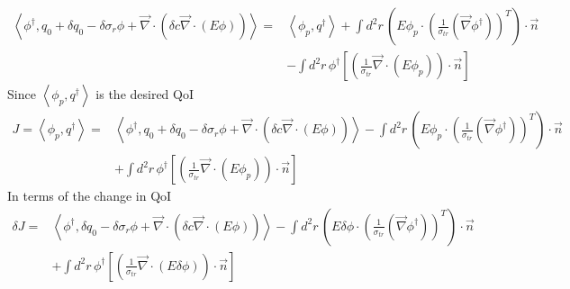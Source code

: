\documentclass{article}
\newcommand{\bra}{\left\langle}
\newcommand{\ket}{\right\rangle}
\newcommand{\vdiv}{\vec{\nabla} \cdot}
\newcommand{\vgrad}{\vec{\nabla}}
\begin{document}
\begin{align*}
\bra \phi^\dag , q_0 + \delta q_0 - \delta \sigma_r \phi + \vdiv \left( \delta c \vdiv \left( E \phi \right) \right) \ket =& \bra \phi_p, q^\dag \ket + \int d^2 r \, \left( E \phi_p \cdot \left( \frac{1}{ \sigma_{tr}} \left(  \vgrad \phi^\dag \right) \right)^T \right) \cdot \vec{n} \\
&- \int d^2 r \, \phi^\dag \left[ \left( \frac{1}{\sigma_{tr}} \vdiv \left( E \phi_p \right) \right) \cdot \vec{n} \right]
\end{align*}
Since $\bra \phi_p, q^\dag \ket $ is the desired QoI
\begin{align*}
J = \bra \phi_p, q^\dag \ket =& \bra \phi^\dag , q_0 + \delta q_0 - \delta \sigma_r \phi + \vdiv \left( \delta c \vdiv \left( E \phi \right) \right)  \ket - \int d^2 r \, \left( E \phi_p \cdot \left( \frac{1}{ \sigma_{tr}} \left(  \vgrad \phi^\dag \right) \right)^T \right) \cdot \vec{n} \\
&+ \int d^2 r \, \phi^\dag \left[ \left( \frac{1}{\sigma_{tr}} \vdiv \left( E \phi_p \right) \right) \cdot \vec{n} \right]
\end{align*}
In terms of the change in QoI
\begin{align*}
\delta J =& \bra \phi^\dag , \delta q_0 - \delta \sigma_r \phi + \vdiv \left( \delta c \vdiv \left( E \phi \right) \right)  \ket - \int d^2 r \, \left( E \delta \phi \cdot \left( \frac{1}{ \sigma_{tr}} \left(  \vgrad \phi^\dag \right) \right)^T \right) \cdot \vec{n} \\
&+ \int d^2 r \, \phi^\dag \left[ \left( \frac{1}{\sigma_{tr}} \vdiv \left( E \delta \phi \right) \right) \cdot \vec{n} \right]
\end{align*}

\newpage
\end{document}
